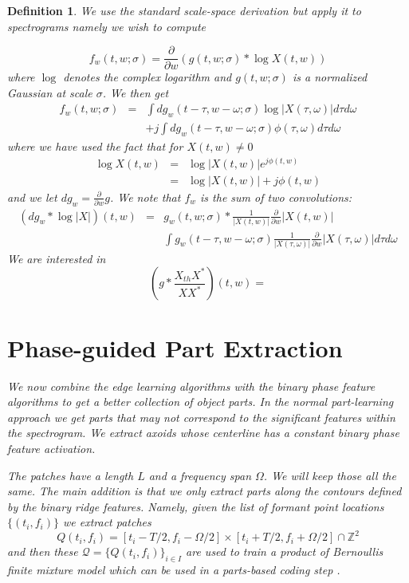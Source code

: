 \documentclass[english]{article}
\newtheorem{defn}{Definition}[section]
\begin{document}
\begin{defn}
We use the standard scale-space derivation but apply it to spectrograms
namely we wish to compute

\[
f_{w}(t,w;\sigma)=\frac{\partial}{\partial w}(g(t,w;\sigma)*\log X(t,w))
\]
where $\log$ denotes the complex logarithm and $g(t,w;\sigma)$ is
a normalized Gaussian at scale $\sigma$. We then get
\begin{eqnarray*}
f_{w}(t,w;\sigma) & = & \int dg_{w}(t-\tau,w-\omega;\sigma)\log|X(\tau,\omega)|d\tau d\omega\\
 &  & +j\int dg_{w}(t-\tau,w-\omega;\sigma)\phi(\tau,\omega)d\tau d\omega
\end{eqnarray*}
where we have used the fact that for $X(t,w)\neq0$ 
\begin{eqnarray*}
\log X(t,w) & = & \log|X(t,w)|e^{j\phi(t,w)}\\
 & = & \log|X(t,w)|+j\phi(t,w)
\end{eqnarray*}
and we let $dg_{w}=\frac{\partial}{\partial w}g$. We note that $f_{w}$
is the sum of two convolutions:
\begin{eqnarray*}
(dg_{w}*\log|X|)(t,w) & = & g_{w}(t,w;\sigma)*\frac{1}{|X(t,w)|}\frac{\partial}{\partial w}|X(t,w)|\\
 &  & \int g_{w}(t-\tau,w-\omega;\sigma)\frac{1}{|X(\tau,\omega)|}\frac{\partial}{\partial w}|X(\tau,\omega)|d\tau d\omega
\end{eqnarray*}
We are interested in
\[
\left(g*\frac{X_{th}X^{*}}{XX^{*}}\right)(t,w)=
\]

\section{Phase-guided Part Extraction}

We now combine the edge learning algorithms with the binary
phase feature algorithms to get a better collection of object
parts.  In the normal part-learning approach we get parts
that may not correspond to the significant features within
the spectrogram.  We extract axoids whose centerline has a
constant binary phase feature activation.

The patches have a length $L$ and a frequency span $\Omega$.
We will keep those all the same.  The main addition is that we only
extract parts along the contours defined by the binary ridge features.
Namely, given the list of formant point locations
$\{(t_i,f_i)\}$ we extract patches
\begin{equation}
Q(t_i,f_i) = [t_i-T/2,f_i-\Omega/2] \times [t_i+T/2,f_i+\Omega/2] \cap \mathbb{Z}^2
\end{equation}
and then these $\mathcal{Q}=\{Q(t_i,f_i)\}_{i\in I}$ are used to train
a product of Bernoullis finite mixture model which can be used in
a parts-based coding step \cite{AmitBernstein}.



\end{defn}
\end{document}
